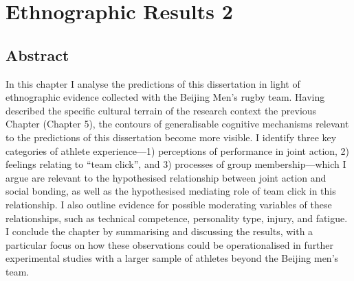 \chapter{\label{5ethnographicResults}Ethnographic Results 2}

\minitoc



\section{Abstract}
In this chapter I analyse the predictions of this dissertation in light of ethnographic evidence collected with the Beijing Men's rugby team.  Having described the specific cultural terrain of the research context the previous Chapter (Chapter 5), the contours of generalisable cognitive mechanisms relevant to the predictions of this dissertation become more visible. I identify three key categories of athlete experience---1) perceptions of performance in joint action, 2) feelings relating to ``team click'', and 3) processes of group membership---which I argue are relevant to the hypothesised relationship between joint action and social bonding, as well as the hypothesised mediating role of team click in this relationship. I also outline evidence for possible moderating variables of these relationships, such as technical competence, personality type, injury, and fatigue. I conclude the chapter by summarising and discussing the results, with a particular focus on how these observations could be operationalised in further experimental studies with a larger sample of athletes beyond the Beijing men's team.






